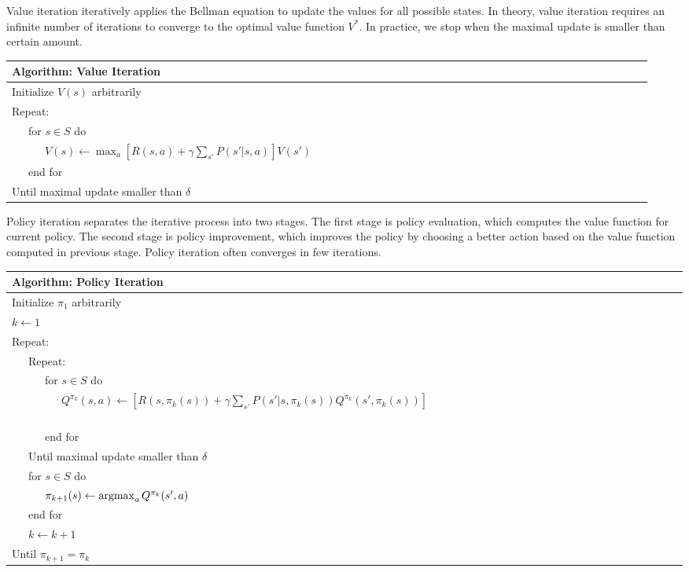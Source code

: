 Value iteration iteratively applies the Bellman equation to update the
values for all possible states. In theory, value iteration requires an infinite number of iterations to converge to the optimal value function $V^*$.
In practice, we stop when the maximal update is smaller than certain amount.

\begin{center}
\begin{tabular}{@{}lp{6cm}@{}}
\hline
Algorithm: Value Iteration\\
\hline
Initialize $V(s)$ arbitrarily\\
Repeat:\\
\ \ \ for $s \in S$ do\\
\ \ \ \ \ \ $V(s) \leftarrow \max_a [R(s, a) + \gamma \sum_{s'} P(s'|s, a)]V(s')$\ \ \ \ \ \ \ \ \ \ \ \ \ \ \ \ \ \ \ \ \ \ \ \ \ \ \ \ \ \ \ \ \ \ \ \ \ \ \ \ \ \ \ \ \ \ \ \ \ \ \ \ \ \ \ \ \ \ \\
\ \ \ end for\\
Until maximal update smaller than $\delta$\\
\hline  
\end{tabular}
\end{center}

Policy iteration separates the iterative process into two stages. The first stage is policy evaluation, which computes the value function for
current policy. The second stage is policy improvement, which improves the
policy by choosing a better action based on the value function computed in
previous stage. Policy iteration often converges in few iterations. 

\begin{center}
\begin{tabular}{@{}lp{6cm}@{}}
\hline
Algorithm: Policy Iteration\\
\hline
Initialize $\pi_1$ arbitrarily\\
$k \leftarrow 1$\\
Repeat:\\
\ \ \ Repeat:\\
\ \ \ \ \ \ for $s \in S$ do\\
\ \ \ \ \ \ \ \ \ $Q^{\pi_k}(s, a) \leftarrow [R(s, \pi_k(s)) + \gamma \sum_{s'} P(s'|s, \pi_k(s)) Q^{\pi_k}(s', \pi_k(s))]$\ \ \ \ \ \ \ \ \ \ \ \ \ \ \ \ \ \ \ \ \ \ \ \ \ \ \ \ \ \ \ \ \ \ \ \ \ \ \ \ \ \ \ \ \ \ \ \ \\
\ \ \ \ \ \ end for\\
\ \ \ Until maximal update smaller than $\delta$\\
\ \ \ for $s \in S$ do\\
\ \ \ \ \ \ $\pi_{k+1}(s) \leftarrow \argmax_a Q^{\pi_k}(s', a)$\\
\ \ \ end for\\
\ \ \ $k \leftarrow k + 1$\\
Until $\pi_{k+1} = \pi_{k}$\\
\hline  
\end{tabular}
\end{center}

